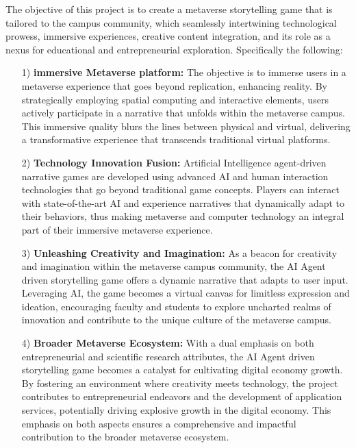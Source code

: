 The objective of this project is to create a metaverse storytelling game that is tailored to the campus community,
which seamlessly intertwining technological prowess, immersive experiences, creative content integration, 
and its role as a nexus for educational and entrepreneurial exploration. Specifically the following:
\begin{itemize}
    \item [1)] 
    \textbf{immersive Metaverse platform:} The objective is to immerse users in a metaverse experience that goes beyond replication, enhancing reality. By strategically employing spatial computing and interactive elements, users actively participate in a narrative that unfolds within the metaverse campus. 
    This immersive quality blurs the lines between physical and virtual, delivering a transformative experience that transcends traditional virtual platforms.
    \item [2)]
    \textbf{Technology Innovation Fusion:} Artificial Intelligence agent-driven narrative games are developed using advanced AI and human interaction technologies 
    that go beyond traditional game concepts. Players can interact with state-of-the-art AI and experience narratives that dynamically adapt to their behaviors, 
    thus making metaverse and computer technology an integral part of their immersive metaverse experience.
    \item [3)]
    \textbf{Unleashing Creativity and Imagination:} As a beacon for creativity and imagination within the metaverse campus community, the AI Agent driven storytelling game offers a dynamic narrative that adapts to user input. Leveraging AI, the game becomes a virtual canvas for limitless expression and ideation, 
    encouraging faculty and students to explore uncharted realms of innovation and contribute to the unique culture of the metaverse campus.
    \item [4)]
    \textbf{Broader Metaverse Ecosystem:} With a dual emphasis on both entrepreneurial and scientific research attributes, the AI Agent driven storytelling game becomes a catalyst for cultivating digital economy growth. By fostering an environment where creativity meets technology, 
    the project contributes to entrepreneurial endeavors and the development of application services, potentially driving explosive growth in the digital economy. 
    This emphasis on both aspects ensures a comprehensive and impactful contribution to the broader metaverse ecosystem.
\end{itemize}

